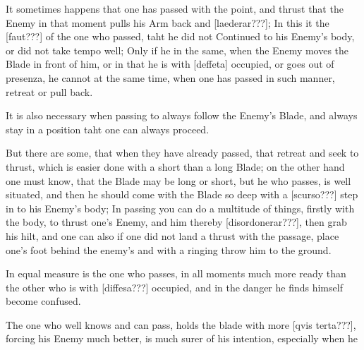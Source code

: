 It sometimes happens that one has passed with the point, and thrust
that the Enemy in that moment pulls his Arm back and [laederar???]; In
this it the [faut???] of the one who passed, taht he did not Continued
to his Enemy's body, or did not take tempo well; Only if he in the
same, when the Enemy moves the Blade in front of him, or in that he is
with [deffeta] occupied, or goes out of presenza, he cannot at the
same time, when one has passed in such manner, retreat or pull back.


It is also necessary when passing to always follow the Enemy's Blade,
and always stay in a position taht one can always proceed.


But there are some, that when they have already passed, that retreat
and seek to thrust, which is easier done with a
short than a long Blade; on the other hand one must know, that the
Blade may be long or short, but he who passes, is well situated, and
then he should come with the Blade so deep with a [scurso???] step in
to his Enemy's body; In passing you can do a multitude of things,
firstly with the body, to thrust one's Enemy, and him thereby
[disordonerar???], then grab his hilt, and one can also if one did not
land a thrust with the passage, place one's foot behind the enemy's
and with a ringing throw him to the ground.


In equal measure is the one who passes, in all moments much more ready
than the other who is with [diffesa???] occupied, and in the danger he
finds himself become confused.


The one who well knows and can pass, holds the blade with more [qvis
terta???], forcing his Enemy much better, is much surer of his
intention, especially when he
